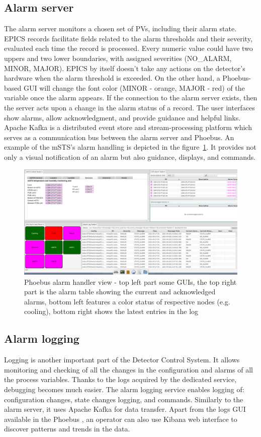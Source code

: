 \subsection{Alarm server}
The alarm server monitors a chosen set of \gls{PV}s, including their alarm state. EPICS records facilitate fields related to the alarm thresholds and their severity, evaluated each time the record is processed. Every numeric value could have two uppers and two lower boundaries, with assigned severities (NO\_ALARM, MINOR, MAJOR). EPICS by itself doesn't take any actions on the detector's hardware when the alarm threshold is exceeded. On the other hand, a Phoebus-based GUI will change the font color (MINOR - orange, MAJOR - red) of the variable once the alarm appears. If the connection to the alarm server exists, then the server acts upon a change in the alarm status of a record. The user interfaces show alarms, allow acknowledgment, and provide guidance and helpful links. Apache Kafka is a distributed event store and stream-processing platform which serves as a communication bus between the alarm server and Phoebus. An example of the mSTS's alarm handling is depicted in the figure~\ref{fig_alarm1}. It provides not only a visual notification of an alarm but also guidance, displays, and commands.
\begin{figure}[!h]
\centering
\includegraphics[width=1\columnwidth]{Chapter4/images/alarms.png}
\caption{Phoebus alarm handler view -  top left part some \gls{GUI}s, the top right part is the alarm table showing the current and acknowledged alarms, bottom left features a color status of respective nodes (e.g. cooling), bottom right shows the latest entries in the log}
\label{fig_alarm1}
\end{figure}
\newpage
\subsection{Alarm logging}
Logging is another important part of the Detector Control System. It allows monitoring and checking of all the changes in the configuration and alarms of all the process variables. Thanks to the logs acquired by the dedicated service, debugging becomes much easier. The alarm logging service enables logging of: configuration changes, state changes logging, and commands. Similarly to the alarm server, it uses Apache Kafka for data transfer. Apart from the logs \gls{GUI} available in the Phoebus \cite{alarm_logger}, an operator can also use Kibana web interface to discover patterns and trends in the data. 

